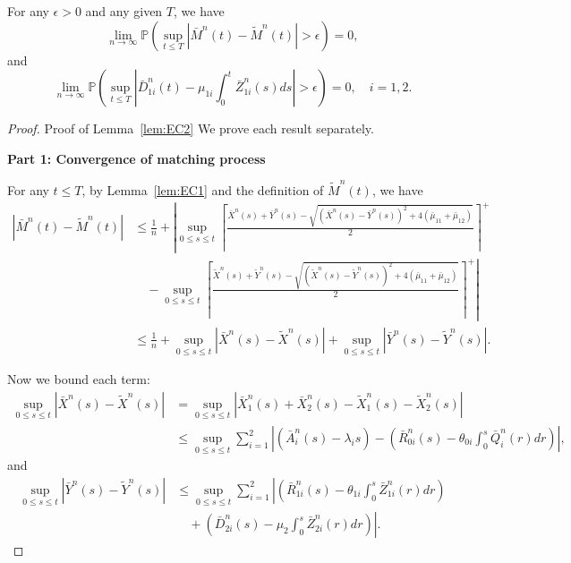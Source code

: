 \begin{lemma} \label{lem:EC2}
For any $\epsilon > 0$ and any given $T$, we have
\begin{equation}
\lim_{n \to \infty} \mathbb{P} \left( \sup_{t \le T} |\bar{M}^n(t) - \tilde{M}^n(t)| > \epsilon \right) = 0, \label{eq:EC44}
\end{equation}
and
\begin{equation}
\lim_{n \to \infty} \mathbb{P} \left( \sup_{t \le T} \left|\bar{D}^n_{1i}(t) - \mu_{1i} \int_0^t \bar{Z}^n_{1i}(s)ds\right| > \epsilon \right) = 0, \quad i = 1,2. \label{eq:EC45}
\end{equation}
\end{lemma}
\begin{proof}{Proof of Lemma~\ref{lem:EC2}}
We prove each result separately.

\textbf{Part 1: Convergence of matching process}

For any $t \le T$, by Lemma~\ref{lem:EC1} and the definition of $\tilde{M}^n(t)$, we have
\begin{align}
|\bar{M}^n(t) - \tilde{M}^n(t)| &\le \frac{1}{n} + \left| \sup_{0 \le s \le t} \left\lceil \frac{\bar{X}^n(s) + \bar{Y}^n(s) - \sqrt{(\bar{X}^n(s) - \bar{Y}^n(s))^2 + 4(\bar{\mu}_{11}+\bar{\mu}_{12})}}{2} \right\rceil^+ \right. \nonumber \\
&\quad - \left. \sup_{0 \le s \le t} \left\lceil \frac{\tilde{X}^n(s) + \tilde{Y}^n(s) - \sqrt{(\tilde{X}^n(s) - \tilde{Y}^n(s))^2 + 4(\bar{\mu}_{11}+\bar{\mu}_{12})}}{2} \right\rceil^+ \right| \nonumber \\
&\le \frac{1}{n} + \sup_{0 \le s \le t} |\bar{X}^n(s) - \tilde{X}^n(s)| + \sup_{0 \le s \le t} |\bar{Y}^n(s) - \tilde{Y}^n(s)|.
\end{align}

Now we bound each term:
\begin{align}
\sup_{0 \le s \le t} |\bar{X}^n(s) - \tilde{X}^n(s)| &= \sup_{0 \le s \le t} |\bar{X}^n_1(s) + \bar{X}^n_2(s) - \tilde{X}^n_1(s) - \tilde{X}^n_2(s)| \nonumber \\
&\le \sup_{0 \le s \le t} \sum_{i=1}^{2} \left| (\bar{A}^n_i(s) - \lambda_i s) - (\bar{R}^n_{0i}(s) - \theta_{0i} \int_0^s \bar{Q}^n_i(r)dr) \right|,
\end{align}
and
\begin{align}
\sup_{0 \le s \le t} |\bar{Y}^n(s) - \tilde{Y}^n(s)| &\le \sup_{0 \le s \le t} \sum_{i=1}^{2} \left| (\bar{R}^n_{1i}(s) - \theta_{1i} \int_0^s \bar{Z}^n_{1i}(r)dr) \right. \nonumber \\
&\quad + \left. (\bar{D}^n_{2i}(s) - \mu_2 \int_0^s \bar{Z}^n_{2i}(r)dr) \right|.
\end{align}


\end{proof}
